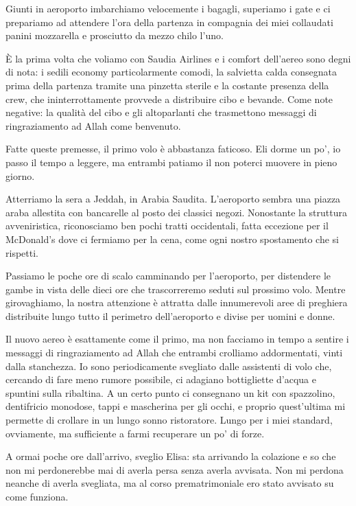 Giunti in aeroporto imbarchiamo velocemente i bagagli, superiamo i gate e ci prepariamo ad attendere l'ora della partenza in compagnia dei miei collaudati panini mozzarella e prosciutto da mezzo chilo l'uno.

È la prima volta che voliamo con Saudia Airlines e i comfort dell'aereo sono degni di nota: i sedili economy particolarmente comodi, la salvietta calda consegnata prima della partenza tramite una pinzetta sterile e la costante presenza della crew, che ininterrottamente provvede a distribuire cibo e bevande. Come note negative: la qualità del cibo e gli altoparlanti che trasmettono messaggi di ringraziamento ad Allah come benvenuto.

Fatte queste premesse, il primo volo è abbastanza faticoso. Eli dorme un po', io passo il tempo a leggere, ma entrambi patiamo il non poterci muovere in pieno giorno.

Atterriamo la sera a Jeddah, in Arabia Saudita. L'aeroporto sembra una piazza araba allestita con bancarelle al posto dei classici negozi. Nonostante la struttura avveniristica, riconosciamo ben pochi tratti occidentali, fatta eccezione per il McDonald's dove ci fermiamo per la cena, come ogni nostro spostamento che si rispetti.

Passiamo le poche ore di scalo camminando per l'aeroporto, per distendere le gambe in vista delle dieci ore che trascorreremo seduti sul prossimo volo. Mentre girovaghiamo, la nostra attenzione è attratta dalle innumerevoli aree di preghiera distribuite lungo tutto il perimetro dell'aeroporto e divise per uomini e donne.

Il nuovo aereo è esattamente come il primo, ma non facciamo in tempo a sentire i messaggi di ringraziamento ad Allah che entrambi crolliamo addormentati, vinti dalla stanchezza. Io sono periodicamente svegliato dalle assistenti di volo che, cercando di fare meno rumore possibile, ci adagiano bottigliette d'acqua e spuntini sulla ribaltina. A un certo punto ci consegnano un kit con spazzolino, dentifricio monodose, tappi e mascherina per gli occhi, e proprio quest'ultima mi permette di crollare in un lungo sonno ristoratore. Lungo per i miei standard, ovviamente, ma sufficiente a farmi recuperare un po' di forze.

A ormai poche ore dall'arrivo, sveglio Elisa: sta arrivando la colazione e so che non mi perdonerebbe mai di averla persa senza averla avvisata. Non mi perdona neanche di averla svegliata, ma al corso prematrimoniale ero stato avvisato su come funziona.

